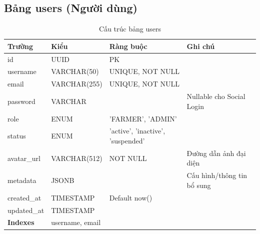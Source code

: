 \documentclass[12pt,a4paper]{article}
\begin{document}
\subsection{Bảng users (Người dùng)}
\begin{longtable}{|l|l|l|p{5cm}|}
    \caption{Cấu trúc bảng users}                                                                                            \\
    \hline
    \rowcolor{headerblue}
    \textbf{Trường}  & \textbf{Kiểu}                        & \textbf{Ràng buộc}                & \textbf{Ghi chú}           \\
    \hline
    id               & UUID                                 & PK                                &                            \\
    \hline
    username         & VARCHAR(50)                          & UNIQUE, NOT NULL                  &                            \\
    \hline
    email            & VARCHAR(255)                         & UNIQUE, NOT NULL                  &                            \\
    \hline
    password         & VARCHAR                              &                                   & Nullable cho Social Login  \\
    \hline
    role             & ENUM                                 & 'FARMER', 'ADMIN'                 &                            \\
    \hline
    status           & ENUM                                 & 'active', 'inactive', 'suspended' &                            \\
    \hline
    avatar\_url      & VARCHAR(512)                         & NOT NULL                          & Đường dẫn ảnh đại diện     \\
    \hline
    metadata         & JSONB                                &                                   & Cấu hình/thông tin bổ sung \\
    \hline
    created\_at      & TIMESTAMP                            & Default now()                     &                            \\
    \hline
    updated\_at      & TIMESTAMP                            &                                   &                            \\
    \hline
    \rowcolor{headerblue}
    \textbf{Indexes} & \multicolumn{3}{l|}{username, email}                                                                  \\
    \hline
\end{longtable}
\end{document}
